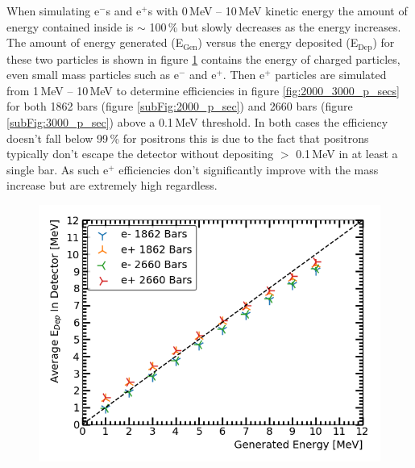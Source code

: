 When simulating e$^-$s and e$^+$s with 0\,MeV -- 10\,MeV kinetic energy the amount of energy contained inside is $\sim$ 100\,\% but slowly decreases as the energy increases. The amount of energy generated (E$_\textrm{{Gen}}$) versus the energy deposited  (E$_\textrm{{Dep}}$) for these two particles is shown in figure \ref{fig:recon_gen_ele_pos} contains the energy of charged particles, even small mass particles such as e$^-$ and e$^+$. Then e$^+$ particles are simulated from 1\,MeV -- 10\,MeV to determine efficiencies in figure \ref{fig:2000_3000_p_secs} for both 1862 bars (figure \ref{subFig:2000_p_sec}) and 2660 bars (figure \ref{subFig:3000_p_sec}) above a 0.1\,MeV threshold. In both cases the efficiency doesn't fall below 99\,\% for positrons this is due to the fact that positrons typically don't escape the detector without depositing $>$ 0.1\,MeV in at least a single bar. As such e$^+$ efficiencies don't significantly improve with the mass increase but are extremely high regardless.  

\begin{figure}[!h]
 \centering
 \includegraphics[width=0.7\linewidth]{Chapter4/Figs/summedVsTruth_1862_2660_e-e+_eBars_Adjusted.png}
 \label{fig:recon_gen_ele_pos}
\end{figure} 

